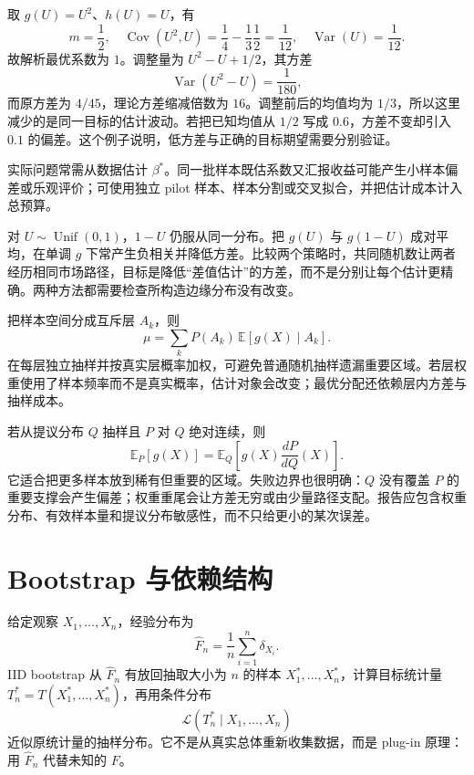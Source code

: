 取 $g(U)=U^2$、$h(U)=U$，有
\[
  m=\frac12,\quad
  \operatorname{Cov}(U^2,U)=\frac14-\frac13\frac12=\frac1{12},\quad
  \operatorname{Var}(U)=\frac1{12}.
\]
故解析最优系数为 $1$。调整量为 $U^2-U+1/2$，其方差
\[
  \operatorname{Var}(U^2-U)=\frac1{180},
\]
而原方差为 $4/45$，理论方差缩减倍数为 $16$。调整前后的均值均为 $1/3$，所以这里减少的是同一目标的估计波动。若把已知均值从 $1/2$ 写成 $0.6$，方差不变却引入 $0.1$ 的偏差。这个例子说明，低方差与正确的目标期望需要分别验证。

实际问题常需从数据估计 $\beta^*$。同一批样本既估系数又汇报收益可能产生小样本偏差或乐观评价；可使用独立 pilot 样本、样本分割或交叉拟合，并把估计成本计入总预算。



对 $U\sim\operatorname{Unif}(0,1)$，$1-U$ 仍服从同一分布。把
$g(U)$ 与 $g(1-U)$ 成对平均，在单调 $g$ 下常产生负相关并降低方差。比较两个策略时，共同随机数让两者经历相同市场路径，目标是降低“差值估计”的方差，而不是分别让每个估计更精确。两种方法都需要检查所构造边缘分布没有改变。


把样本空间分成互斥层 $A_k$，则
\[
  \mu=\sum_k P(A_k)\,\mathbb E[g(X)\mid A_k].
\]
在每层独立抽样并按真实层概率加权，可避免普通随机抽样遗漏重要区域。若层权重使用了样本频率而不是真实概率，估计对象会改变；最优分配还依赖层内方差与抽样成本。


若从提议分布 $Q$ 抽样且 $P$ 对 $Q$ 绝对连续，则
\[
  \mathbb E_P[g(X)]
  =\mathbb E_Q\!\left[g(X)\frac{dP}{dQ}(X)\right].
\]
它适合把更多样本放到稀有但重要的区域。失败边界也很明确：$Q$ 没有覆盖 $P$ 的重要支撑会产生偏差；权重重尾会让方差无穷或由少量路径支配。报告应包含权重分布、有效样本量和提议分布敏感性，而不只给更小的某次误差。

\section{Bootstrap 与依赖结构}

给定观察 $X_1,\ldots,X_n$，经验分布为
\[
  \hat F_n=\frac1n\sum_{i=1}^n\delta_{X_i}.
\]
IID bootstrap 从 $\hat F_n$ 有放回抽取大小为 $n$ 的样本
$X_1^*,\ldots,X_n^*$，计算目标统计量 $T_n^*=T(X_1^*,\ldots,X_n^*)$，再用条件分布
\[
\mathcal L(T_n^*\mid X_1,\ldots,X_n)
\]
近似原统计量的抽样分布。它不是从真实总体重新收集数据，而是 plug-in 原理：用 $\hat F_n$ 代替未知的 $F$。


